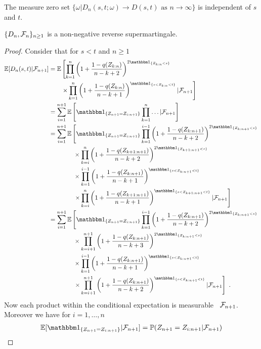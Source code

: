 \begin{remark}
	The measure zero set $\{\omega| D_n(s,t;\omega) \to D(s,t) \textrm{ as } n\to\infty\}$ is independent of $s$ and $t$.
\end{remark}
%
\begin{lemma} \label{lem:dn_supermart}
	$\{D_n, \mathcal{F}_n\}_{n\geq 1}$ is a non-negative reverse supermartingale.
	\begin{proof}
		Consider that for $s<t$ and $n\geq 1$
		\begin{align*}
		\E[D_n(s,t)| \F_{n+1}] &= \E\left[\prod_{k=1}^{n}\left(1+\frac{1-q(Z_{k:n})}{n-k+2}\right)^{2\I{Z_{k:n} <s}}\right.\\
		&\qquad \left. \times \prod_{k=1}^{n}\left(1+\frac{1-q(Z_{k:n})}{n-k+1}\right)^\I{s < Z_{k:n} < t} | \F_{n+1}\right]\\
		&= \sum_{i=1}^{n+1}\E\left[\I{Z_{n+1} = Z_{i:n+1}} \prod_{k=1}^{n}\dots | \F_{n+1}\right]\\
		&= \sum_{i=1}^{n+1}\E\left[\I{Z_{n+1} = Z_{i:n+1}} \prod_{k=1}^{i-1}\left(1+\frac{1-q(Z_{k:n+1})}{n-k+2}\right)^{2\I{Z_{k:n+1} <s}} \right.\\
		&\qquad\qquad \times \prod_{k=i}^{n}\left(1+\frac{1-q(Z_{k+1:n+1})}{n-k+2}\right)^{2\I{Z_{k+1:n+1} <s}}\\
		&\qquad\qquad \times \prod_{k=1}^{i-1}\left(1+\frac{1-q(Z_{k:n+1})}{n-k+1}\right)^\I{s < Z_{k:n+1} < t}\\
		&\qquad\qquad \left. \times \prod_{k=i}^{n}\left(1+\frac{1-q(Z_{k+1:n+1})}{n-k+1}\right)^\I{s < Z_{k+1:n+1} < t}| \F_{n+1}\right]\\
		&= \sum_{i=1}^{n+1}\E\left[\I{Z_{n+1} = Z_{i:n+1}} \prod_{k=1}^{i-1}\left(1+\frac{1-q(Z_{k:n+1})}{n-k+2}\right)^{2\I{Z_{k:n+1} <s}} \right.\\
		&\qquad\qquad \times \prod_{k=i+1}^{n+1}\left(1+\frac{1-q(Z_{k:n+1})}{n-k+3}\right)^{2\I{Z_{k:n+1} <s}}\\
		&\qquad\qquad \times \prod_{k=1}^{i-1}\left(1+\frac{1-q(Z_{k:n+1})}{n-k+1}\right)^\I{s < Z_{k:n+1} < t}\\
		&\qquad\qquad \left. \times \prod_{k=i+1}^{n+1}\left(1+\frac{1-q(Z_{k:n+1})}{n-k+2}\right)^\I{s < Z_{k:n+1} < t}| \F_{n+1}\right]\mdot
		\end{align*}
		Now each product within the conditional expectation is measurable \wrt\ $\mathcal{F}_{n+1}$. Moreover we have for $i=1,\dots,n$ 
		\begin{align*}
		\E[\I{Z_{n+1}=Z_{i:n+1}}|\F_{n+1}] &= \P(Z_{n+1}=Z_{i:n+1}|\F_{n+1})\\

\end{align*}
\end{proof}
\end{lemma}
